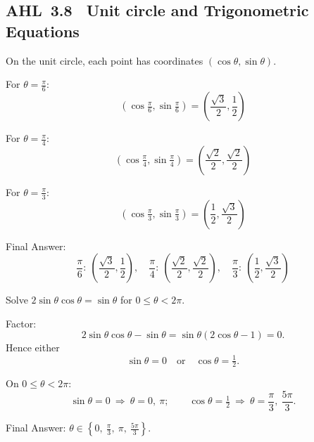 \documentclass[11pt]{article}
\def\textbf#1{#1}%
\newcommand{\tocsubsection}[1]{\subsection{#1}}
\begin{document}
\tocsubsection{AHL 3.8 \; Unit circle and Trigonometric Equations}


\begin{solution}
On the unit circle, each point has coordinates \((\cos\theta,\sin\theta)\).

For \(\theta = \frac{\pi}{6}\):
\[
(\cos\tfrac{\pi}{6}, \sin\tfrac{\pi}{6}) = \left(\frac{\sqrt{3}}{2}, \frac12\right)
\]

For \(\theta = \frac{\pi}{4}\):
\[
(\cos\tfrac{\pi}{4}, \sin\tfrac{\pi}{4}) = \left(\frac{\sqrt{2}}{2}, \frac{\sqrt{2}}{2}\right)
\]

For \(\theta = \frac{\pi}{3}\):
\[
(\cos\tfrac{\pi}{3}, \sin\tfrac{\pi}{3}) = \left(\frac12, \frac{\sqrt{3}}{2}\right)
\]

\begin{center}
\end{center}

\textbf{Final Answer:}
\[
\frac{\pi}{6}:\ \left(\frac{\sqrt3}{2},\frac12\right),\quad
\frac{\pi}{4}:\ \left(\frac{\sqrt2}{2},\frac{\sqrt2}{2}\right),\quad
\frac{\pi}{3}:\ \left(\frac12,\frac{\sqrt3}{2}\right)
\]
\end{solution}


\begin{solution}
Solve \(2\sin\theta\cos\theta=\sin\theta\) for \(0\le \theta<2\pi\).

Factor:
\[
2\sin\theta\cos\theta-\sin\theta=\sin\theta(2\cos\theta-1)=0.
\]
Hence either
\[
\sin\theta=0 \quad\text{or}\quad \cos\theta=\tfrac12.
\]

On \(0\le \theta<2\pi\):
\[
\sin\theta=0 \ \Rightarrow\ \theta=0,\ \pi;
\qquad
\cos\theta=\tfrac12 \ \Rightarrow\ \theta=\frac{\pi}{3},\ \frac{5\pi}{3}.
\]

\textbf{Final Answer:} \(\boxed{\theta\in\left\{0,\ \frac{\pi}{3},\ \pi,\ \frac{5\pi}{3}\right\}.}\)
\end{solution}
\end{document}
